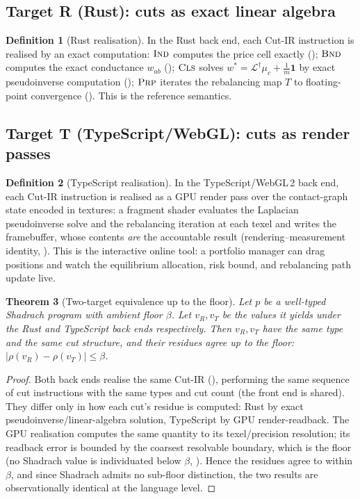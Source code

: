 \documentclass[11pt,a4paper]{article}
\theoremstyle{thmstyle}
\newtheorem{theorem}{Theorem}[section]
\theoremstyle{definition}
\newtheorem{definition}[theorem]{Definition}
\theoremstyle{remark}
\newcommand{\wt}{w}
\newcommand{\flo}{\beta}
\newcommand{\res}{\rho}
\newcommand{\abs}[1]{\lvert#1\rvert}
\newcommand{\Lap}{\mathcal{L}}
\begin{document}
\subsection{Target R (Rust): cuts as exact linear algebra}

\begin{definition}[Rust realisation]
\label{def:rust-target}
In the Rust back end, each Cut-IR instruction is realised by an exact
computation: $\textsc{Ind}$ computes the price cell exactly
(); $\textsc{Bnd}$ computes the exact conductance
$\wt_{ab}$ (); $\textsc{Cls}$ solves
$w^\ast=\Lap^{\dagger}\mu_c+\tfrac1m\mathbf{1}$ by exact pseudoinverse
computation (); $\textsc{Prp}$ iterates the
rebalancing map $T$ to floating-point convergence
(). This is the reference semantics.
\end{definition}

\subsection{Target T (TypeScript/WebGL): cuts as render passes}

\begin{definition}[TypeScript realisation]
\label{def:ts-target}
In the TypeScript/WebGL\,2 back end, each Cut-IR instruction is realised
as a GPU render pass over the contact-graph state encoded in textures: a
fragment shader evaluates the Laplacian pseudoinverse solve and the
rebalancing iteration at each texel and writes the framebuffer, whose
contents \emph{are} the accountable result (rendering--measurement
identity, ). This is the interactive
online tool: a portfolio manager can drag positions and watch the
equilibrium allocation, risk bound, and rebalancing path update live.
\end{definition}

\begin{theorem}[Two-target equivalence up to the floor]
\label{thm:target-equiv}
Let $p$ be a well-typed Shadrach program with ambient floor $\flo$. Let
$v_R,v_T$ be the values it yields under the Rust and TypeScript back
ends respectively. Then $v_R,v_T$ have the same type and the same cut
structure, and their residues agree up to the floor:
$\abs{\res(v_R)-\res(v_T)}\le\flo$.
\end{theorem}

\begin{proof}
Both back ends realise the same Cut-IR (), performing the
same sequence of cut instructions with the same types and cut count
(the front end is shared). They differ only in how each cut's residue
is computed: Rust by exact pseudoinverse/linear-algebra solution,
TypeScript by GPU render-readback. The GPU realisation computes the
same quantity to its texel/precision resolution; its readback error is
bounded by the coarsest resolvable boundary, which is the floor (no
Shadrach value is individuated below $\flo$, ).
Hence the residues agree to within $\flo$, and since Shadrach admits no
sub-floor distinction, the two results are observationally identical at
the language level.
\end{proof}
\end{document}

